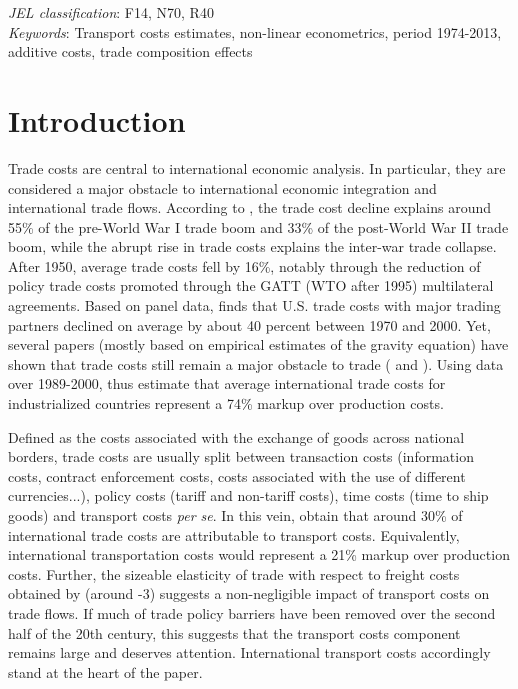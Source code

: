\documentclass[a4paper,11pt]{article}
\begin{document}
\thispagestyle{empty} \pagestyle{plain} \setcounter{page}{1}

\bigskip


\noindent \emph{JEL classification}: F14, N70, R40 \\
\noindent \emph{Keywords}: Transport costs estimates, non-linear econometrics, period 1974-2013, additive costs, trade composition effects

{\normalsize \vspace{0cm} }

{\normalsize \titlepage }

{\normalsize \newpage }


\section{Introduction \label{sec:Intro}}

Trade costs are central to international economic analysis. In particular, they are considered a major obstacle to international economic integration and international trade flows. According to \cite{Jacks08}, the trade cost decline explains around 55\% of the pre-World War I trade boom and 33\% of the post-World War II trade boom, while the abrupt rise in trade costs explains the inter-war trade collapse. After 1950, average trade costs fell by 16\%, notably through the reduction of policy trade costs promoted through the GATT (WTO after 1995) multilateral agreements. Based on panel data, \citet{novy13} finds  that U.S. trade costs with major trading partners declined on average by about 40 percent between 1970 and 2000. Yet, several papers (mostly based on empirical estimates of the gravity equation) have shown that trade costs still remain a major obstacle to trade (\citealp{Head_Mayer04} and \citealp{Disdier_Head08}). Using data over 1989-2000, \citet{anderson_wincoop_jel} thus estimate that average international trade costs for industrialized countries represent a 74\% markup over production costs.

Defined as the costs associated with the exchange of goods across national borders, trade costs are usually split between transaction costs (information costs, contract enforcement costs, costs associated with the use of different currencies...), policy costs (tariff  and non-tariff costs), time costs (time to ship goods) and transport costs \emph{per se}. In this vein, \citet{anderson_wincoop_jel} obtain that around 30\% of international trade costs are attributable to transport costs. Equivalently, international transportation costs would represent a 21\% markup over production costs. Further, the sizeable elasticity of trade with respect to freight costs obtained by \cite{Behar_Venables} (around -3) suggests a non-negligible impact of transport costs on trade flows. If much of trade policy barriers have been removed over the second half of the 20th century, this suggests that the transport costs component remains large and deserves attention. International transport costs accordingly stand at the heart of the paper.\smallskip
\end{document}
